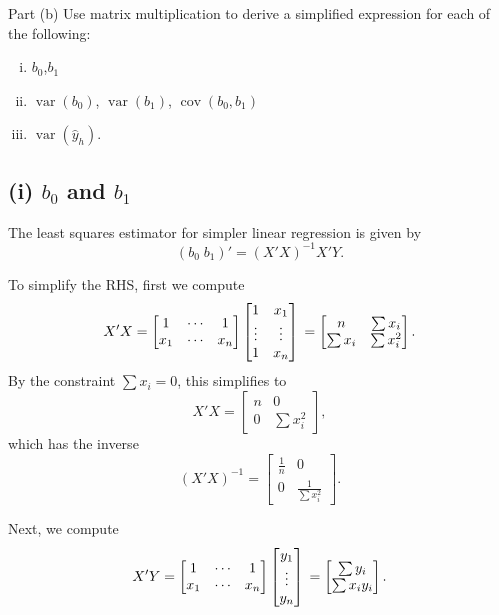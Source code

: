\documentclass[
]{article}
\begin{document}
\begin{tcolorbox}[split=\f]
Part (b)
\tcblower
Use matrix multiplication to derive a simplified expression for each of the
following:
\begin{enumerate}[(i)]
\item $b_0$,$b_1$
\item $\operatorname{var}(b_0)$, $\operatorname{var}(b_1)$, $\operatorname{cov}(b_0,b_1)$
\item $\operatorname{var}(\hat{y}_h)$.
\end{enumerate}
\end{tcolorbox}

\hypertarget{i-b_0-and-b_1}{%
\subsection{\texorpdfstring{(i) \(b_0\) and
\(b_1\)}{(i) b\_0 and b\_1}}\label{i-b_0-and-b_1}}

The least squares estimator for simpler linear regression is given by \[
  (b_0\;b_1)' = (X'X)^{-1} X' Y.
\]

To simplify the RHS, first we compute \[
  X'X
  =
  \begin{bmatrix}
    1   & \cdots & 1\\
    x_1 & \cdots & x_n
  \end{bmatrix}
  \begin{bmatrix}
    1 & x_1\\
    \vdots & \vdots\\
    1 & x_n
   \end{bmatrix}\\
  =
  \begin{bmatrix}
    n        & \sum x_i\\
    \sum x_i & \sum x_i^2
  \end{bmatrix}.
\] By the constraint \(\sum x_i = 0\), this simplifies to \[
  X'X =
  \begin{bmatrix}
    n & 0\\
    0 & \sum x_i^2
  \end{bmatrix},
\] which has the inverse \[
  (X'X)^{-1} =
  \begin{bmatrix}
    \frac{1}{n} & 0\\
    0           & \frac{1}{\sum x_i^2}
  \end{bmatrix}.
\]

Next, we compute \[
  X'Y
  =
  \begin{bmatrix}
    1   & \cdots & 1\\
    x_1 & \cdots & x_n
  \end{bmatrix}
  \begin{bmatrix}
    y_1\\
    \vdots\\
    y_n
   \end{bmatrix}\\
  =
  \begin{bmatrix}
    \sum y_i\\
    \sum x_i y_i
  \end{bmatrix}.
\]
\end{document}
